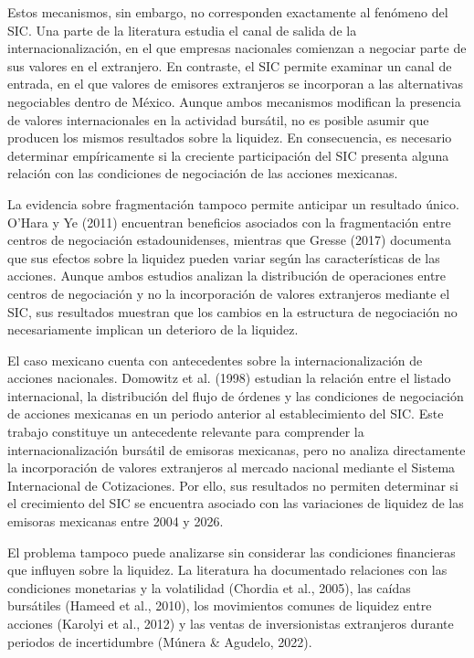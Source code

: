 Estos mecanismos, sin embargo, no corresponden exactamente al fenómeno del SIC. Una parte de la literatura estudia el canal de salida de la internacionalización, en el que empresas nacionales comienzan a negociar parte de sus valores en el extranjero. En contraste, el SIC permite examinar un canal de entrada, en el que valores de emisores extranjeros se incorporan a las alternativas negociables dentro de México. Aunque ambos mecanismos modifican la presencia de valores internacionales en la actividad bursátil, no es posible asumir que producen los mismos resultados sobre la liquidez. En consecuencia, es necesario determinar empíricamente si la creciente participación del SIC presenta alguna relación con las condiciones de negociación de las acciones mexicanas.

La evidencia sobre fragmentación tampoco permite anticipar un resultado único. O'Hara y Ye (2011) encuentran beneficios asociados con la fragmentación entre centros de negociación estadounidenses, mientras que Gresse (2017) documenta que sus efectos sobre la liquidez pueden variar según las características de las acciones. Aunque ambos estudios analizan la distribución de operaciones entre centros de negociación y no la incorporación de valores extranjeros mediante el SIC, sus resultados muestran que los cambios en la estructura de negociación no necesariamente implican un deterioro de la liquidez.

El caso mexicano cuenta con antecedentes sobre la internacionalización de acciones nacionales. Domowitz et al. (1998) estudian la relación entre el listado internacional, la distribución del flujo de órdenes y las condiciones de negociación de acciones mexicanas en un periodo anterior al establecimiento del SIC. Este trabajo constituye un antecedente relevante para comprender la internacionalización bursátil de emisoras mexicanas, pero no analiza directamente la incorporación de valores extranjeros al mercado nacional mediante el Sistema Internacional de Cotizaciones. Por ello, sus resultados no permiten determinar si el crecimiento del SIC se encuentra asociado con las variaciones de liquidez de las emisoras mexicanas entre 2004 y 2026.

El problema tampoco puede analizarse sin considerar las condiciones financieras que influyen sobre la liquidez. La literatura ha documentado relaciones con las condiciones monetarias y la volatilidad (Chordia et al., 2005), las caídas bursátiles (Hameed et al., 2010), los movimientos comunes de liquidez entre acciones (Karolyi et al., 2012) y las ventas de inversionistas extranjeros durante periodos de incertidumbre (Múnera \& Agudelo, 2022).

